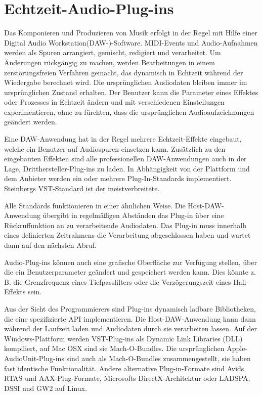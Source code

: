 \section{Echtzeit-Audio-Plug-ins}

Das Komponieren und Produzieren von Musik erfolgt in der Regel mit Hilfe einer Digital Audio Workstation(DAW-)-Software. MIDI-Events und Audio-Aufnahmen werden als Spuren arrangiert, gemischt, redigiert und verarbeitet. Um Änderungen rückgängig zu machen, werden Bearbeitungen in einem zerstörungsfreien Verfahren gemacht, das dynamisch in Echtzeit während der Wiedergabe berechnet wird. Die ursprünglichen Audiodaten bleiben immer im ursprünglichen Zustand erhalten. Der Benutzer kann die Parameter eines Effektes oder Prozesses in Echtzeit ändern und mit verschiedenen Einstellungen experimentieren, ohne zu fürchten, dass die ursprünglichen Audioaufzeichnungen geändert werden.

Eine DAW-Anwendung hat in der Regel mehrere Echtzeit-Effekte eingebaut, welche ein Benutzer auf Audiospuren einsetzen kann. Zusätzlich zu den eingebauten Effekten sind alle professionellen DAW-Anwendungen auch in der Lage, Dritthersteller-Plug-ins zu laden. In Abhängigkeit von der Plattform und dem Anbieter werden ein oder mehrere Plug-In-Standards implementiert. Steinbergs VST-Standard ist der meistverbreitete.

Alle Standards funktionieren in einer ähnlichen Weise. Die Host-DAW-Anwendung übergibt in regelmäßigen Abständen das Plug-in über eine Rückruffunktion an zu verarbeitende Audiodaten. Das Plug-in muss innerhalb eines definierten Zeitrahmens die Verarbeitung abgeschlossen haben und wartet dann auf den nächsten Abruf.

Audio-Plug-ins können auch eine grafische Oberfläche zur Verfügung stellen, über die ein Benutzerparameter geändert und gespeichert werden kann. Dies könnte z. B. die Grenzfrequenz eines Tiefpassfilters oder die Verzögerungszeit eines Hall-Effekts sein.

Aus der Sicht des Programmierers sind Plug-ins dynamisch ladbare Bibliotheken, die eine spezifizierte API implementieren. Die Host-DAW-Anwendung kann dann  während der Laufzeit laden und Audiodaten durch sie verarbeiten lassen\cite{realtime-architectures}. Auf der Windows-Plattform werden VST-Plug-ins als Dynamic Link Libraries (DLL) kompiliert, auf Mac OSX sind sie Mach-O-Bundles. Die  ursprünglichen Apple-AudioUnit-Plug-ins sind auch als Mach-O-Bundles zusammengestellt, sie haben fast identische Funktionalität. Andere alternative Plug-in-Formate sind Avids RTAS und AAX-Plug-Formate, Microsofts DirectX-Architektur oder LADSPA, DSSI und GW2 auf Linux.

